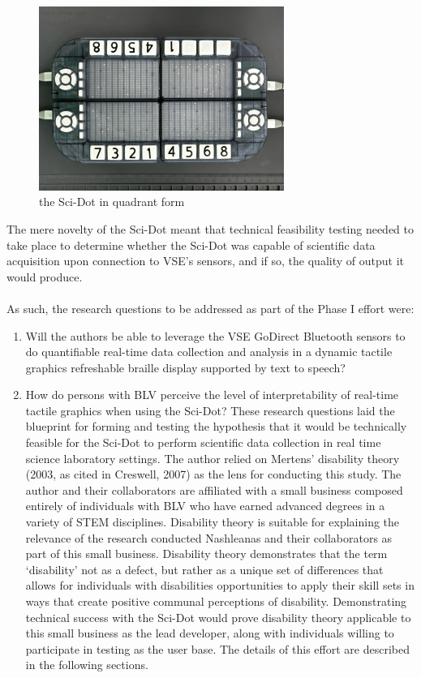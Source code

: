 \documentclass[11.5pt]{sig-alternate}
\begin{document}
\begin{large}
   \begin{figure}[htp]
    \centering
    \includegraphics[width=8cm]{figure 3.png}
 \caption{the Sci-Dot in quadrant form }
    \label{the Sci-Dot in quadrant form}
\end{figure}

The mere novelty of the Sci-Dot meant that technical feasibility testing needed to take place to determine whether the Sci-Dot was capable of scientific data acquisition upon connection to VSE’s sensors, and if so, the quality of output it would produce. 
\\
\\As such, the research questions to be addressed as part of the Phase I effort were: 
\begin{enumerate}
    \item 
Will the authors be able to leverage the VSE GoDirect Bluetooth sensors to do quantifiable real-time data collection and analysis in a dynamic tactile graphics refreshable braille display supported by text to speech?\\
\item 
How do persons with BLV perceive the level of interpretability of real-time tactile graphics when using the Sci-Dot? These research questions laid the blueprint for forming and testing the hypothesis that it would be technically feasible for the Sci-Dot to perform scientific data collection in real time science laboratory settings. The author relied on Mertens’ disability theory (2003, as cited in Creswell, 2007) as the lens for conducting this study. The author and their collaborators are affiliated with a small business composed entirely of individuals with BLV who have earned advanced degrees in a variety of STEM disciplines. Disability theory is suitable for explaining the relevance of the research conducted Nashleanas and their collaborators as part of this small business. Disability theory demonstrates that the term ‘disability’ not as a defect, but rather as a unique set of differences that allows for individuals with disabilities opportunities to apply their skill sets in ways that create positive communal perceptions of disability. Demonstrating technical success with the Sci-Dot would prove disability theory applicable to this small business as the lead developer, along with individuals willing to participate in testing as the user base. The details of this effort are described in the following sections.
\end{enumerate}


\end{large}
\end{document}

